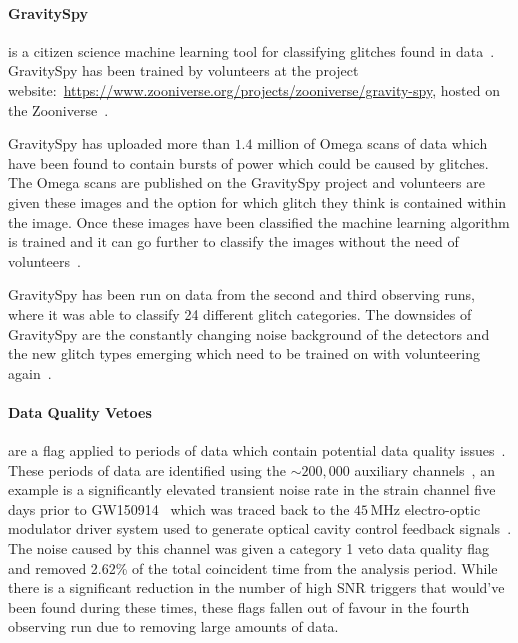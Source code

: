 \paragraph{GravitySpy}

is a citizen science machine learning tool for classifying glitches found in \gwadj data~\cite{gravityspy:2017}. GravitySpy has been trained by volunteers at the project website:~\href{https://www.zooniverse.org/projects/zooniverse/gravity-spy}{https://www.zooniverse.org/projects/zooniverse/gravity-spy}, hosted on the Zooniverse~\cite{zooniverse}.

GravitySpy has uploaded more than $1.4$ million of Omega scans of \gwadj data which have been found to contain bursts of power which could be caused by glitches. The Omega scans are published on the GravitySpy project and volunteers are given these images and the option for which glitch they think is contained within the image. Once these images have been classified the machine learning algorithm is trained and it can go further to classify the images without the need of volunteers~\cite{gravityspy:2021}.

GravitySpy has been run on data from the second and third observing runs, where it was able to classify 24 different glitch categories. The downsides of GravitySpy are the constantly changing noise background of the \gwadj detectors and the new glitch types emerging which need to be trained on with volunteering again~\cite{gravityspy:2023}.

\paragraph{Data Quality Vetoes} are a flag applied to periods of data which contain potential data quality issues~\cite{DQ_vetoes:2017}. These periods of data are identified using the ${\sim}200,000$ auxiliary channels~\cite{DQ_vetoes:2017}, an example is a significantly elevated transient noise rate in the strain channel five days prior to GW150914~\cite{GW150914:2016} which was traced back to the $45 \, \text{MHz}$ electro-optic modulator driver system used to generate optical cavity control feedback signals~\cite{aLIGO:2015}. The noise caused by this channel was given a category 1 veto data quality flag and removed 2.62\% of the total coincident time from the analysis period. While there is a significant reduction in the number of high SNR triggers that would've been found during these times, these flags fallen out of favour in the fourth observing run due to removing large amounts of data.
